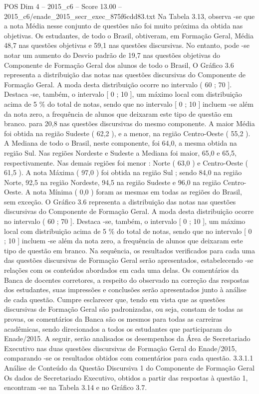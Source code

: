 \begin{textsample}{POS Dim 4 – 2015\_c6 – Score 13.00 – 2015\_c6/enade\_2015\_secr\_exec\_875f6cdd83.txt}
Na Tabela 3.13, observa -se que a nota Média nesse conjunto de questões não foi muito próxima da obtida nas objetivas.
Os estudantes, de todo o Brasil, obtiveram, em Formação Geral, Média 48,7 nas questões objetivas e 59,1 nas questões discursivas.
No entanto, pode -se notar um aumento do Desvio padrão de 19,7 nas questões objetivas do Componente de Formação Geral dos alunos de todo o Brasil, O Gráfico 3.6 representa a distribuição das notas nas questões discursivas do Componente de Formação Geral.
A moda desta distribuição ocorre no intervalo ( 60 ; 70 ].
Destaca -se, também, o intervalo [ 0 ; 10 ], um máximo local com distribuição acima de 5 \% do total de notas, sendo que no intervalo [ 0 ; 10 ] incluem -se além da nota zero, a frequência de alunos que deixaram este tipo de questão em branco. para 20,8 nas questões discursivas do mesmo componente.
A maior Média foi obtida na região Sudeste ( 62,2 ), e a menor, na região Centro-Oeste ( 55,2 ).
A Mediana de todo o Brasil, neste componente, foi 64,0, a mesma obtida na região Sul.
Nas regiões Nordeste e Sudeste a Mediana foi maior, 65,0 e 65,5, respectivamente.
Nas demais regiões foi menor : Norte ( 63,0 ) e Centro-Oeste ( 61,5 ).
A nota Máxima ( 97,0 ) foi obtida na região Sul ; sendo 84,0 na região Norte, 92,5 na região Nordeste, 94,5 na região Sudeste e 96,0 na região Centro-Oeste.
A nota Mínima ( 0,0 ) foram as mesmas em todas as regiões do Brasil, sem exceção.
O Gráfico 3.6 representa a distribuição das notas nas questões discursivas do Componente de Formação Geral.
A moda desta distribuição ocorre no intervalo ( 60 ; 70 ].
Destaca -se, também, o intervalo [ 0 ; 10 ], um máximo local com distribuição acima de 5 \% do total de notas, sendo que no intervalo [ 0 ; 10 ] incluem -se além da nota zero, a frequência de alunos que deixaram este tipo de questão em branco.
Na sequência, os resultados verificados para cada uma das questões discursivas de Formação Geral serão apresentados, estabelecendo -se relações com os conteúdos abordados em cada uma delas.
Os comentários da Banca de docentes corretores, a respeito do observado na correção das respostas dos estudantes, suas impressões e conclusões serão apresentados junto à análise de cada questão.
Cumpre esclarecer que, tendo em vista que as questões discursivas de Formação Geral são padronizadas, ou seja, constam de todas as provas, os comentários da Banca são os mesmos para todas as carreiras acadêmicas, sendo direcionados a todos os estudantes que participaram do Enade/2015.
A seguir, serão analisados os desempenhos da Área de Secretariado Executivo nas duas questões discursivas de Formação Geral do Enade/2015, comparando -se os resultados obtidos com comentários para cada questão. 3.3.1.1 Análise de Conteúdo da Questão Discursiva 1 do Componente de Formação Geral Os dados de Secretariado Executivo, obtidos a partir das respostas à questão 1, encontram -se na Tabela 3.14 e no Gráfico 3.7.

\end{textsample}
